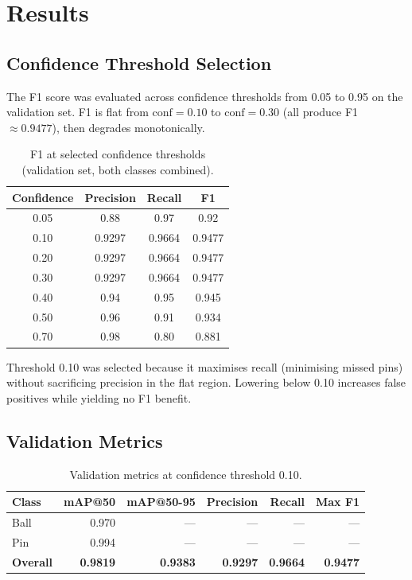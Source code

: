 \documentclass[11pt,a4paper]{article}
\begin{document}
\section{Results}

\subsection{Confidence Threshold Selection}
\label{sec:conf-sweep}

The F1 score was evaluated across confidence thresholds from 0.05 to 0.95 on the validation set. F1 is flat from $\mathrm{conf}=0.10$ to $\mathrm{conf}=0.30$ (all produce F1 $\approx 0.9477$), then degrades monotonically.

\begin{table}[H]
\centering
\caption{F1 at selected confidence thresholds (validation set, both classes combined).}
\label{tab:conf-sweep}
\begin{tabular}{cccc}
\toprule
Confidence & Precision & Recall & F1 \\
\midrule
0.05 & 0.88 & 0.97 & 0.92 \\
0.10 & 0.9297 & 0.9664 & 0.9477 \\
0.20 & 0.9297 & 0.9664 & 0.9477 \\
0.30 & 0.9297 & 0.9664 & 0.9477 \\
0.40 & 0.94   & 0.95   & 0.945  \\
0.50 & 0.96   & 0.91   & 0.934  \\
0.70 & 0.98   & 0.80   & 0.881  \\
\bottomrule
\end{tabular}
\end{table}

Threshold 0.10 was selected because it maximises recall (minimising missed pins) without sacrificing precision in the flat region. Lowering below 0.10 increases false positives while yielding no F1 benefit.

\subsection{Validation Metrics}
\label{sec:val-metrics}

\begin{table}[H]
\centering
\caption{Validation metrics at confidence threshold 0.10.}
\label{tab:val-metrics}
\begin{tabular}{lrrrrr}
\toprule
Class & mAP@50 & mAP@50-95 & Precision & Recall & Max F1 \\
\midrule
Ball              & 0.970  & ---    & ---    & ---    & ---    \\
Pin               & 0.994  & ---    & ---    & ---    & ---    \\
\textbf{Overall}  & \textbf{0.9819} & \textbf{0.9383} & \textbf{0.9297} & \textbf{0.9664} & \textbf{0.9477} \\
\bottomrule
\end{tabular}
\end{table}
\end{document}
